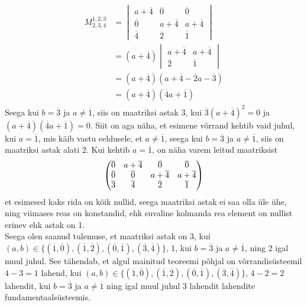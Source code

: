 \documentclass{article}
\newcommand\q[1]{\overline{#1}}
\begin{document}
\begin{gather*}
\begin{aligned}
M_{2,3,4}^{1,2,3}
&=\begin{vmatrix}a+\q{4} & \q{0} & \q{0}\\\q{0} & a+\q{4} & a+\q{4}\\\q{4} & \q{2} & \q{1}\end{vmatrix}\\
&=(a+\q{4})\begin{vmatrix}a+\q{4} & a+\q{4}\\\q{2} & \q{1}\end{vmatrix}\\
&=(a+\q{4})(a+\q{4}-\q{2}a-\q{3})\\
&=(a+\q{4})(\q{4}a+\q{1})
\end{aligned}
\end{gather*}
Seega kui $b=\q{3}$ ja $a\neq\q{1}$, siis on maatriksi astak 3, kui $\q{3}(a+\q{4})^2=0$ ja $(a+\q{4})(\q{4}a+\q{1})=0$. Siit on aga näha, et esimene võrrand kehtib vaid juhul, kui $a=\q{1}$, mis käib vastu eeldusele, et $a\neq\q{1}$, seega kui $b=\q{3}$ ja $a\neq\q{1}$, siis on maatriksi astak alati 2. Kui kehtib $a=\q{1}$, on näha varem leitud maatriksist
\begin{align}
\begin{pmatrix}
\q{0} & a+\q{4} & \q{0} & \q{0}\\
\q{0} & \q{0} & a+\q{4} & a+\q{4}\\
\q{3} & \q{4} & \q{2} & \q{1}\notag
\end{pmatrix}
\end{align}
et esimesed kaks rida on kõik nullid, seega maatriksi astak ei saa olla üle ühe, ning viimases reas on konstandid, ehk suvaline kolmanda rea element on nullist erinev ehk astak on 1.\\
Seega olen saanud tulemuse, et maatriksi astak on 3, kui $(a,b)\in\{(\q{1},\q{0}),(\q{1},\q{2}),(\q{0},\q{1}),(\q{3},\q{4})\}$, 1, kui $b=\q{3}$ ja $a\neq\q{1}$, ning 2 igal muul juhul. See tähendab, et algul mainitud teoreemi põhjal on võrrandisüsteemil $4-3=1$ lahend, kui $(a,b)\in\{(\q{1},\q{0}),(\q{1},\q{2}),(\q{0},\q{1}),(\q{3},\q{4})\}$, $4-2=2$ lahendit, kui $b=\q{3}$ ja $a\neq\q{1}$ ning igal muul juhul 3 lahendit lahendite fundamentaalsüsteemis.
\end{document}

